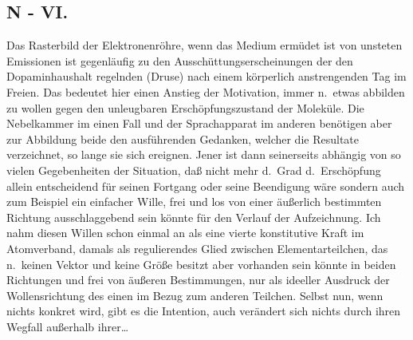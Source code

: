 \documentclass[
]{article}
\author{}
\date{\vspace{-2.5em}}
\begin{document}
\subsection{N - VI.}\label{n---vi.}

Das Rasterbild der Elektronenröhre, wenn das Medium ermüdet ist von
unsteten Emissionen ist gegenläufig zu den Ausschüttungserscheinungen
der den Dopaminhaushalt regelnden (Druse) nach einem körperlich
anstrengenden Tag im Freien. Das bedeutet hier einen Anstieg der
Motivation, immer n.~etwas abbilden zu wollen gegen den unleugbaren
Erschöpfungszustand der Moleküle. Die Nebelkammer im einen Fall und der
Sprachapparat im anderen benötigen aber zur Abbildung beide den
ausführenden Gedanken, welcher die Resultate verzeichnet, so lange sie
sich ereignen. Jener ist dann seinerseits abhängig von so vielen
Gegebenheiten der Situation, daß nicht mehr d.~Grad d.~Erschöpfung
allein entscheidend für seinen Fortgang oder seine Beendigung wäre
sondern auch zum Beispiel ein einfacher Wille, frei und los von einer
äußerlich bestimmten Richtung ausschlaggebend sein könnte für den
Verlauf der Aufzeichnung. Ich nahm diesen Willen schon einmal an als
eine vierte konstitutive Kraft im Atomverband, damals als regulierendes
Glied zwischen Elementarteilchen, das n.~keinen Vektor und keine Größe
besitzt aber vorhanden sein könnte in beiden Richtungen und frei von
äußeren Bestimmungen, nur als ideeller Ausdruck der Wollensrichtung des
einen im Bezug zum anderen Teilchen. Selbst nun, wenn nichts konkret
wird, gibt es die Intention, auch verändert sich nichts durch ihren
Wegfall außerhalb ihrer\ldots{}
\end{document}
